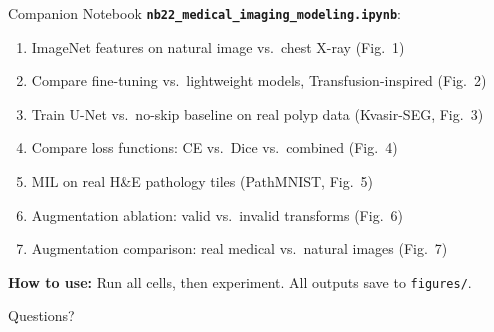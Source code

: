 \documentclass[aspectratio=169,10pt]{beamer}
\begin{document}
\begin{frame}{Companion Notebook}
\textbf{\texttt{nb22\_medical\_imaging\_modeling.ipynb}}:
\begin{enumerate}
    \item ImageNet features on natural image vs.\ chest X-ray (Fig.~1)
    \item Compare fine-tuning vs.\ lightweight models, Transfusion-inspired (Fig.~2)
    \item Train U-Net vs.\ no-skip baseline on real polyp data (Kvasir-SEG, Fig.~3)
    \item Compare loss functions: CE vs.\ Dice vs.\ combined (Fig.~4)
    \item MIL on real H\&E pathology tiles (PathMNIST, Fig.~5)
    \item Augmentation ablation: valid vs.\ invalid transforms (Fig.~6)
    \item Augmentation comparison: real medical vs.\ natural images (Fig.~7)
\end{enumerate}

\textbf{How to use:} Run all cells, then experiment. All outputs save to \texttt{figures/}.
\end{frame}

\begin{frame}[standout]
    Questions?
\end{frame}
\end{document}
